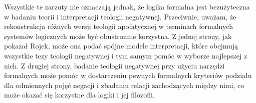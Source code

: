 Wszystkie te zarzuty nie oznaczają jednak, że logika formalna jest
bezużyteczna w badaniu teorii i interpretacji teologii negatywnej.
Przeciwnie, uważam, że rekonstrukcja różnych wersji teologii
apofatycznej w terminach formalnych systemów logicznych może być
obustronnie korzystna. Z jednej strony, jak pokazał Rojek, może ona
podać spójne modele interpretacji, które obejmują wszystkie tezy
teologii negatywnej i tym samym pomóc w wyborze najlepszej z nich. Z
drugiej strony, badanie teologii negatywnej przy użyciu narzędzi
formalnych może pomóc w dostarczeniu pewnych formalnych kryteriów
podziału dla odmiennych pojęć negacji i zbadaniu relacji zachodzących
między nimi, co może okazać się korzystne dla logiki i jej filozofii.

